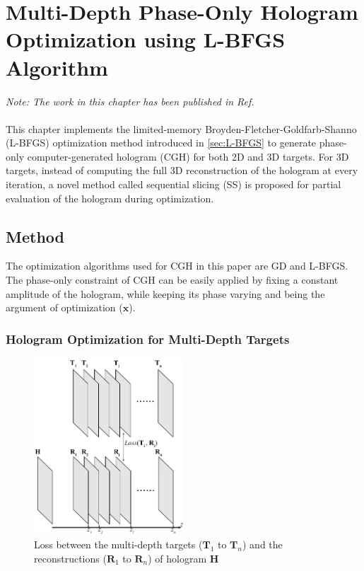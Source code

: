 \chapter{Multi-Depth Phase-Only Hologram Optimization using L-BFGS Algorithm}\label{sec:Numerical Optimisation of Phase-Only CGH}

\graphicspath{{Chapter_Multi_depth_optim/Figs/}}

\textit{Note: The work in this chapter has been published in Ref. \cite{Sha2023}}\\\\

This chapter implements the limited-memory Broyden-Fletcher-Goldfarb-Shanno (L-BFGS) optimization method introduced in \cref{sec:L-BFGS} to generate phase-only computer-generated hologram (CGH) for both 2D and 3D targets. For 3D targets, instead of computing the full 3D reconstruction of the hologram at every iteration, a novel method called sequential slicing (SS) is proposed for partial evaluation of the hologram during optimization.


\section{Method}



The optimization algorithms used for CGH in this paper are GD and L-BFGS. The phase-only constraint of CGH can be easily applied by fixing a constant amplitude of the hologram, while keeping its phase varying and being the argument of optimization ($\textbf{x}$).


\subsection{Hologram Optimization for Multi-Depth Targets}

\begin{figure}[h!]
	\centering
	\includegraphics[width=0.5\textwidth]{Fresnel_slice_illustration}
	\caption{Loss between the multi-depth targets ($\textbf{T}_1$ to $\textbf{T}_n$) and the reconstructions ($\textbf{R}_1$ to $\textbf{R}_n$) of hologram $\textbf{H}$}
	\label{fig:Fresnel_slice_illustration}
\end{figure}

